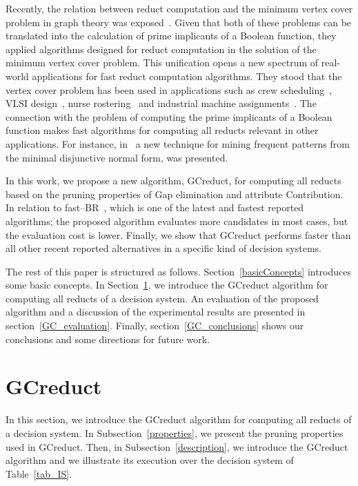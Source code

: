 \documentclass[letterpaper, twoside, openright, 12pt]{book}%
\begin{document}
  Recently, the relation between reduct computation and the minimum vertex cover problem in graph theory was exposed~\cite{chen2015}. Given that both of these problems can be translated into the calculation of prime implicants of a Boolean function, they applied algorithms designed for reduct computation in the solution of the minimum vertex cover problem. This unification opens a new spectrum of real-world applications for fast reduct computation algorithms. They stood that the vertex cover problem has been used in applications such as crew scheduling~\citep{Sherali1984}, VLSI design~\citep{Bhattacharyya2000}, nurse rostering~\citep{Caprara1998} and industrial machine assignments~\citep{Woodyatt1993}. The connection with the problem of computing the prime implicants of a Boolean function makes fast algorithms for computing all reducts relevant in other applications. For instance, in~\cite{Li2015} a new technique for mining frequent patterns from the minimal disjunctive normal form, was presented.

  In this work, we propose a new algorithm, GCreduct, for computing all reducts based on the pruning properties of Gap elimination and attribute Contribution. In relation to fast--BR~\citep{Lias13}, which is one of the latest and fastest reported algorithms; the proposed algorithm evaluates more candidates in most cases, but the evaluation cost is lower. Finally, we show that GCreduct performs faster than all other recent reported alternatives in a specific kind of decision systems. 
  
  The rest of this paper is structured as follows. Section~\ref{basicConcepts}  introduces some basic concepts. In Section~\ref{GCreduct}, we introduce the GCreduct algorithm for computing all reducts of a decision system. An evaluation of the proposed algorithm and a discussion of the experimental results are presented in section~\ref{GC_evaluation}. Finally, section~\ref{GC_conclusions} shows our conclusions and some directions for future work.
   	
%
\section{GCreduct}\label{GCreduct}
%
  In this section, we introduce the GCreduct algorithm for computing all reducts of a decision system. In  Subsection~\ref{properties}, we present the pruning properties used in GCreduct. Then, in Subsection~\ref{description}, we introduce the GCreduct algorithm and we illustrate its execution over the decision system of Table~\ref{tab_IS}.
 
\end{document}
